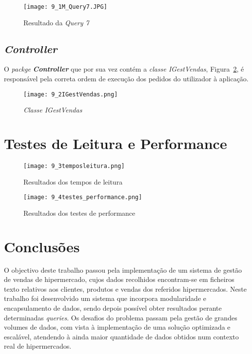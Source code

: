 \documentclass{article}
\begin{document}
\begin{figure}[H]
\texttt{[image: 9\_1M\_Query7.JPG]}
\centering
\caption{Resultado da \textit{Query 7}\label{fig:sete}}
\end{figure}

\subsection{\textit{Controller}}

O \textit{packge} \textbf{\textit{Controller}} que por sua vez contém a \textit{classe IGestVendas}, Figura~\ref{fig:oito}, é responsável pela correta ordem de execução dos pedidos do utilizador à aplicação.

\begin{figure}[H]
\texttt{[image: 9\_2IGestVendas.png]}
\centering
\caption{\textit{Classe IGestVendas}\label{fig:oito}}
\end{figure}


\section{Testes de Leitura e Performance}\label{sec:performance}

\begin{figure}[H]
\texttt{[image: 9\_3temposleitura.png]}
\centering
\caption{Resultados dos tempos de leitura\label{fig:test1}}
\end{figure}

\begin{figure}[H]
\texttt{[image: 9\_4testes\_performance.png]}
\centering
\caption{Resultados dos testes de performance\label{fig:test2}}
\end{figure}

\section{Conclusões}\label{sec:conclusoes}

O objectivo deste trabalho passou pela implementação de um sistema de gestão de vendas de hipermercado, cujos dados recolhidos encontram-se em ficheiros texto relativos aos clientes, produtos e vendas dos referidos hipermercados. Neste trabalho foi desenvolvido um sistema que incorpora modularidade e encapsulamento de dados, sendo depois possível obter resultados perante determinadas \textit{queries}. Os desafios do problema passam pela gestão de grandes volumes de dados, com vista à implementação de uma solução optimizada e escalável, atendendo à ainda maior quantidade de dados obtidos num contexto real de hipermercados. 
\end{document}
